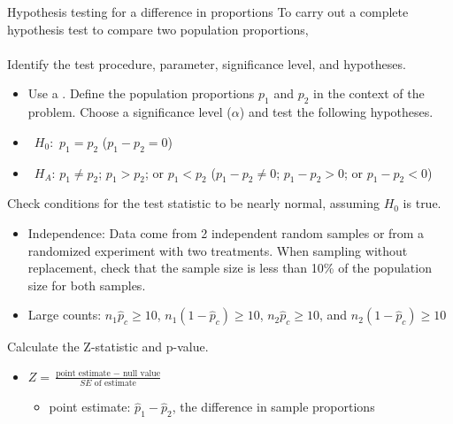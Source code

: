 \begin{onebox}{Hypothesis testing for a difference in proportions}
To carry out a complete hypothesis test to compare two population proportions,
\\
\\
 Identify the test procedure, parameter, significance level, and hypotheses.\vspace{-1mm}
\begin{itemize} 
\item[] Use a .  Define the population proportions $p_1$ and $p_2$ in the context of the problem.  Choose a significance level ($\alpha$) and test the following hypotheses.
\end{itemize} \vspace{-3mm}
\begin{itemize}
\setlength{\itemsep}{0mm}
\item[]  \quad \ $H_0$: \,$p_1 = p_2 $ \qquad  \qquad  \qquad  \qquad \qquad \quad \:  \:  ($p_1 - p_2 = 0$)
\item[]  \quad \ $H_A$: $p_1 \ne p_2$;  \; $p_1  > p_2$; \; or \; $p_1 <  p_2$ \qquad($p_1 - p_2 \ne 0$; \;  $p_1  - p_2  > 0$; \; or \;   $p_1 -  p_2 < 0$)
\end{itemize}
  Check conditions for the test statistic to be nearly normal, assuming $H_0$ is true.  \vspace{-1mm}
{\setlength{\leftmargini}{13mm}
\begin{itemize}
\setlength{\itemsep}{0mm}
\item[1.]  Independence:  Data come from 2 independent random samples or from a randomized 
experiment with two treatments.  When sampling without replacement, check that the 
sample size is less than 10\% of the population size for both samples.
\item[2.] Large counts: $n_1\hat{p}_c\geq 10$, $n_1(1-\hat{p}_c)\geq 10$, $n_2\hat{p}_c\geq 10$, and $n_2(1-\hat{p}_c)\geq 10$
\end{itemize}
}
   Calculate the Z-statistic and p-value.
\begin{itemize}
\item[] $Z = \frac{\text{point estimate } - \text{ null value}}{SE \text{ of estimate}}$
\begin{itemize}
\item[] point estimate: $\hat{p}_1 - \hat{p}_2$,  the difference in sample proportions 

\end{itemize}
\end{itemize}
\end{onebox}
